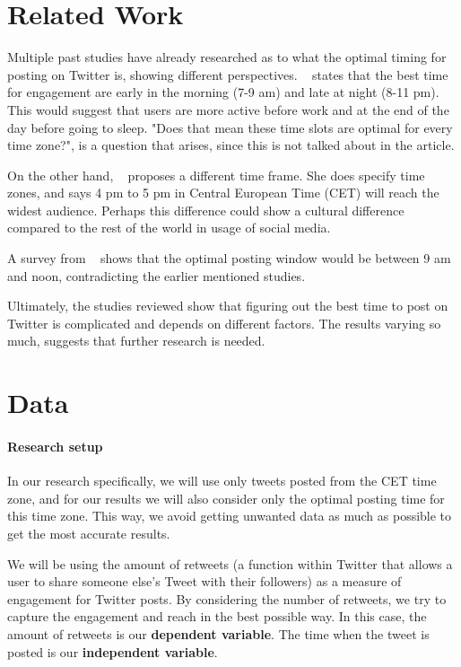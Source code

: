 \documentclass[11pt]{article}
\begin{document}
\section{Related Work}
Multiple past studies have already researched as to what the optimal timing for posting on Twitter is, showing different perspectives. ~\cite{Anoob:2023} states that the best time for engagement are early in the morning (7-9 am) and late at night (8-11 pm). This would suggest that users are more active before work and at the end of the day before going to sleep. "Does that mean these time slots are optimal for every time zone?", is a question that arises, since this is not talked about in the article.

On the other hand, ~\cite{Myers:2024} proposes a different time frame. She does specify time zones, and says 4 pm to 5 pm in Central European Time (CET) will reach the widest audience. Perhaps this difference could show a cultural difference compared to the rest of the world in usage of social media.

A survey from ~\cite{Needle:2023} shows that the optimal posting window would be between 9 am and noon, contradicting the earlier mentioned studies.

Ultimately, the studies reviewed show that figuring out the best time to post on Twitter is complicated and depends on different factors. The results varying so much, suggests that further research is needed.

\section{Data}


\paragraph{Research setup}
In our research specifically, we will use only tweets posted from the CET time zone, and for our results we will also consider only the optimal posting time for this time zone. This way, we avoid getting unwanted data as much as possible to get the most accurate results.

We will be using the amount of retweets (a function within Twitter that allows a user to share someone else's Tweet with their followers) as a measure of engagement for Twitter posts.  By considering the number of retweets, we try to capture the engagement and reach in the best possible way. In this case, the amount of retweets is our \textbf{dependent variable}. The time when the tweet is posted is our \textbf{independent variable}.
\end{document}
